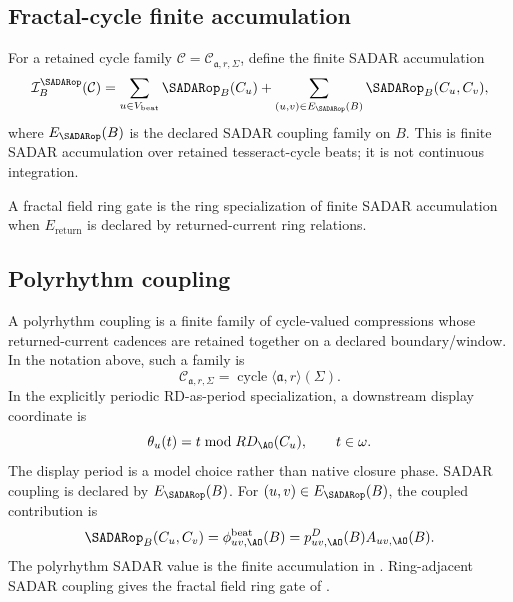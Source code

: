 \subsection{Fractal-cycle finite accumulation}
\label{subsec:fractal-cycle-finite-accumulation}
For a retained cycle family \(\mathcal C=\mathcal C_{\mathfrak a,r,\Sigma}\), define the finite SADAR accumulation
\begin{equation}
\mathcal I^{\SADARop}_{B}(\mathcal C)
=
\sum_{u\in V_{\mathrm{beat}}}
\SADARop_B(C_u)
+
\sum_{(u,v)\in E_{\SADARop}(B)}
\SADARop_B(C_u,C_v),
\label{eq:fractal-cycle-finite-accumulation}
\end{equation}
where \(E_{\SADARop}(B)\) is the declared SADAR coupling family on \(B\). This is finite SADAR accumulation over retained tesseract-cycle beats; it is not continuous integration.

A fractal field ring gate is the ring specialization of finite SADAR accumulation when \(E_{\mathrm{return}}\) is declared by returned-current ring relations.


\subsection{Polyrhythm coupling}
\label{subsec:polyrhythm-coupling}
A polyrhythm coupling is a finite family of cycle-valued compressions whose returned-current cadences are retained together on a declared boundary/window. In the notation above, such a family is
\[
\mathcal C_{\mathfrak a,r,\Sigma}
=
\operatorname{cycle}\langle\mathfrak a,r\rangle(\Sigma).
\]
In the explicitly periodic RD-as-period specialization, a downstream display coordinate is
\begin{equation}
\theta_u(t)=t\bmod RD_{\AO}(C_u),
\qquad t\in\omega.
\label{eq:polyrhythm-phase-coordinate}
\end{equation}
The display period is a model choice rather than native closure phase. SADAR coupling is declared by \(E_{\SADARop}(B)\). For \((u,v)\in E_{\SADARop}(B)\), the coupled contribution is
\begin{equation}
\SADARop_B(C_u,C_v)
=
\phi^{\mathrm{beat}}_{uv,\AO}(B)
=
p^D_{uv,\AO}(B)A_{uv,\AO}(B).
\label{eq:polyrhythm-sadar-coupling}
\end{equation}
The polyrhythm SADAR value is the finite accumulation in . Ring-adjacent SADAR coupling gives the fractal field ring gate of .


